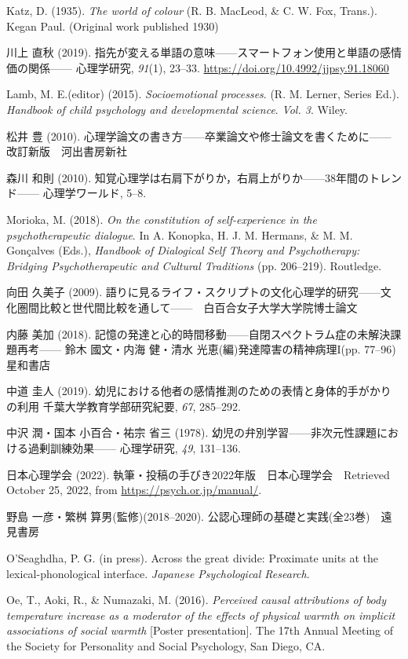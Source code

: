 Katz, D. (1935). \textit{The world of colour} (R. B. MacLeod, \& C. W. Fox, Trans.). Kegan Paul. (Original work published 1930)

川上 直秋 (2019). 指先が変える単語の意味------スマートフォン使用と単語の感情価の関係------ 心理学研究, \textit{91}(1), 23--33. \url{https://doi.org/10.4992/jjpsy.91.18060}

Lamb, M. E.(editor)  (2015). \textit{Socioemotional processes}. (R. M. Lerner, Series Ed.). \textit{Handbook of child psychology and developmental science}. \textit{Vol. 3}. Wiley.

松井 豊 (2010). 心理学論文の書き方------卒業論文や修士論文を書くために------ 改訂新版　河出書房新社

森川 和則 (2010). 知覚心理学は右肩下がりか，右肩上がりか------38年間のトレンド------ 心理学ワールド, 5--8.

Morioka, M. (2018). \textit{On the constitution of self-experience in the psychotherapeutic dialogue}. In A. Konopka, H. J. M. Hermans, \& M. M. Gonçalves (Eds.), \textit{Handbook of Dialogical Self Theory and Psychotherapy: Bridging Psychotherapeutic and Cultural Traditions} (pp. 206--219). Routledge.

向田 久美子 (2009). 語りに見るライフ・スクリプトの文化心理学的研究------文化圏間比較と世代間比較を通して------　白百合女子大学大学院博士論文

内藤 美加 (2018). 記憶の発達と心的時間移動------自閉スペクトラム症の未解決課題再考------ 鈴木 國文・内海 健・清水 光恵(編)発達障害の精神病理I(pp. 77--96)　星和書店

中道 圭人 (2019). 幼児における他者の感情推測のための表情と身体的手がかりの利用 千葉大学教育学部研究紀要, \textit{67}, 285--292.

中沢 潤・国本 小百合・祐宗 省三 (1978). 幼児の弁別学習------非次元性課題における過剰訓練効果------ 心理学研究, \textit{49}, 131--136.

日本心理学会 (2022). 執筆・投稿の手びき2022年版　日本心理学会　Retrieved October 25, 2022, from \url{https://psych.or.jp/manual/}.

野島 一彦・繁桝 算男(監修)(2018--2020).  公認心理師の基礎と実践(全23巻)　遠見書房

O'Seaghdha, P. G. (in press). Across the great divide: Proximate units at the lexical-phonological interface. \textit{Japanese Psychological Research}.

Oe, T., Aoki, R., \& Numazaki, M. (2016). \textit{Perceived causal attributions of body temperature increase as a moderator of the effects of physical warmth on implicit associations of social warmth} [Poster presentation]. The 17th Annual Meeting of the Society for Personality and Social Psychology, San Diego, CA.

